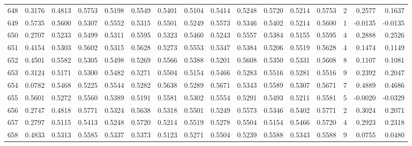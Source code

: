 \begin{tabular}{lrrrrrrrrrrrrrrr}
648 &      0.3176 &  0.4813 &  0.5753 &  0.5198 &  0.5549 &  0.5401 &  0.5104 &  0.5414 &  0.5248 &  0.5720 &   0.5214 &     0.5753 &      2 &                    0.2577 &                     0.1637 \\
649 &      0.5735 &  0.5600 &  0.5307 &  0.5552 &  0.5315 &  0.5501 &  0.5249 &  0.5573 &  0.5346 &  0.5402 &   0.5214 &     0.5600 &      1 &                   -0.0135 &                    -0.0135 \\
650 &      0.2707 &  0.5233 &  0.5499 &  0.5311 &  0.5595 &  0.5323 &  0.5460 &  0.5243 &  0.5557 &  0.5384 &   0.5155 &     0.5595 &      4 &                    0.2888 &                     0.2526 \\
651 &      0.4154 &  0.5303 &  0.5602 &  0.5315 &  0.5628 &  0.5273 &  0.5553 &  0.5347 &  0.5384 &  0.5206 &   0.5519 &     0.5628 &      4 &                    0.1474 &                     0.1149 \\
652 &      0.4501 &  0.5582 &  0.5305 &  0.5498 &  0.5269 &  0.5566 &  0.5388 &  0.5201 &  0.5608 &  0.5350 &   0.5331 &     0.5608 &      8 &                    0.1107 &                     0.1081 \\
653 &      0.3124 &  0.5171 &  0.5300 &  0.5482 &  0.5271 &  0.5504 &  0.5154 &  0.5466 &  0.5283 &  0.5516 &   0.5281 &     0.5516 &      9 &                    0.2392 &                     0.2047 \\
654 &      0.0782 &  0.5468 &  0.5225 &  0.5544 &  0.5282 &  0.5638 &  0.5289 &  0.5671 &  0.5343 &  0.5589 &   0.5307 &     0.5671 &      7 &                    0.4889 &                     0.4686 \\
655 &      0.5601 &  0.5272 &  0.5560 &  0.5389 &  0.5191 &  0.5581 &  0.5302 &  0.5554 &  0.5291 &  0.5493 &   0.5211 &     0.5581 &      5 &                   -0.0020 &                    -0.0329 \\
656 &      0.2747 &  0.4818 &  0.5771 &  0.5324 &  0.5638 &  0.5318 &  0.5501 &  0.5249 &  0.5573 &  0.5346 &   0.5402 &     0.5771 &      2 &                    0.3024 &                     0.2071 \\
657 &      0.2797 &  0.5115 &  0.5413 &  0.5248 &  0.5720 &  0.5214 &  0.5519 &  0.5278 &  0.5504 &  0.5154 &   0.5466 &     0.5720 &      4 &                    0.2923 &                     0.2318 \\
658 &      0.4833 &  0.5313 &  0.5585 &  0.5337 &  0.5373 &  0.5123 &  0.5271 &  0.5504 &  0.5239 &  0.5588 &   0.5343 &     0.5588 &      9 &                    0.0755 &                     0.0480 \\

\end{tabular}
